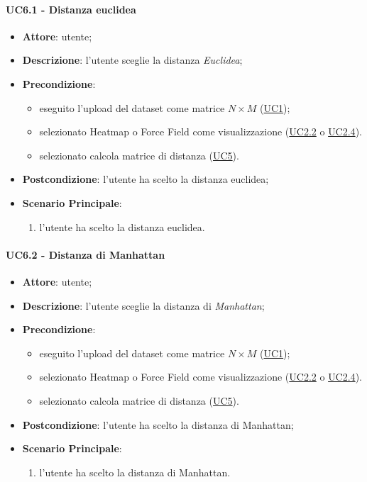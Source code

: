     \paragraph{UC6.1 - Distanza euclidea}
    \label{uc6.1}
    \begin{itemize}
    \item \textbf{Attore}: utente;
    \item \textbf{Descrizione}: l'utente sceglie la distanza \emph{Euclidea};
    \item \textbf{Precondizione}: 
    \begin{itemize}
        \item eseguito l'upload del dataset come matrice $N\times M$ (\hyperref[uc1]{UC1});
        \item selezionato Heatmap o Force Field come visualizzazione (\hyperref[uc2.2]{UC2.2} o \hyperref[uc2.4]{UC2.4}).
        \item selezionato calcola matrice di distanza (\hyperref[uc5]{UC5}).
    \end{itemize}  
    \item \textbf{Postcondizione}: l'utente ha scelto la distanza euclidea;
    \item \textbf{Scenario Principale}: 
    \begin{enumerate}
        \item l'utente ha scelto la distanza euclidea.
    \end{enumerate}
    \end{itemize}
    
    \paragraph{UC6.2 - Distanza di Manhattan}
    \label{uc6.2}
    \begin{itemize}
    \item \textbf{Attore}: utente;
    \item \textbf{Descrizione}: l'utente sceglie la distanza di \emph{Manhattan};
    \item \textbf{Precondizione}: 
    \begin{itemize}
        \item eseguito l'upload del dataset come matrice $N\times M$ (\hyperref[uc1]{UC1});
        \item selezionato Heatmap o Force Field come visualizzazione (\hyperref[uc2.2]{UC2.2} o \hyperref[uc2.4]{UC2.4}).
        \item selezionato calcola matrice di distanza (\hyperref[uc5]{UC5}).
    \end{itemize}  
    \item \textbf{Postcondizione}: l'utente ha scelto la distanza di Manhattan;
    \item \textbf{Scenario Principale}: 
    \begin{enumerate}
        \item l'utente ha scelto la distanza di Manhattan.
    \end{enumerate}
    \end{itemize}
